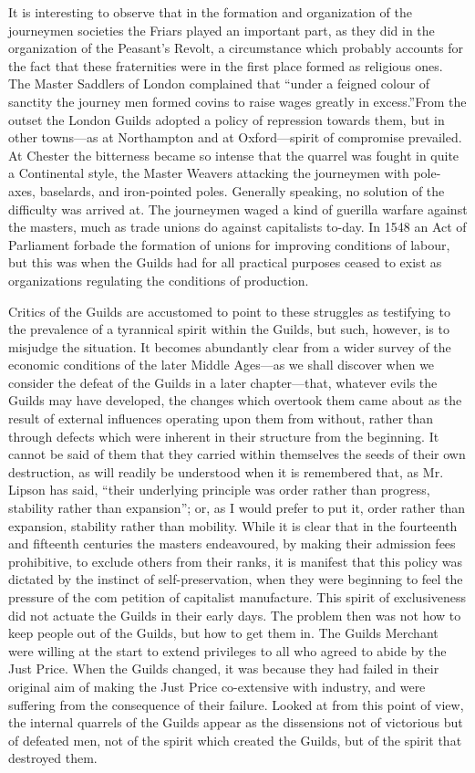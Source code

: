 \documentclass{book}
\begin{document}
It is interesting to observe that in the formation and organization of the journeymen societies the Friars played an important part, as they did in the organization of the Peasant’s Revolt, a circumstance which probably accounts for the fact that these fraternities were in the first place formed as religious ones. The Master Saddlers of London complained that “under a feigned colour of sanctity the journey men formed covins to raise wages greatly in excess.”\footnotemark[7] From the outset the London Guilds adopted a policy of repression towards them, but in other towns—as at Northampton and at Oxford—spirit of compromise prevailed. At Chester the bitterness became so intense that the quarrel was fought in quite a Continental style, the Master Weavers attacking the journeymen with pole-axes, baselards, and iron-pointed poles. Generally speaking, no solution of the difficulty was arrived at. The journeymen waged a kind of guerilla warfare against the masters, much as trade unions do against capitalists to-day. In 1548 an Act of Parliament forbade the formation of unions for improving conditions of labour, but this was when the Guilds had for all practical purposes ceased to exist as organizations regulating the conditions of production.

Critics of the Guilds are accustomed to point to these struggles as testifying to the prevalence of a tyrannical spirit within the Guilds, but such, however, is to misjudge the situation. It becomes abundantly clear from a wider survey of the economic conditions of the later Middle Ages—as we shall discover when we consider the defeat of the Guilds in a later chapter—that, whatever evils the Guilds may have developed, the changes which overtook them came about as the result of external influences operating upon them from without, rather than through defects which were inherent in their structure from the beginning. It cannot be said of them that they carried within themselves the seeds of their own destruction, as will readily be understood when it is remembered that, as Mr. Lipson has said, “their underlying principle was order rather than progress, stability rather than expansion”; or, as I would prefer to put it, order rather than expansion, stability rather than mobility. While it is clear that in the fourteenth and fifteenth centuries the masters endeavoured, by making their admission fees prohibitive, to exclude others from their ranks, it is manifest that this policy was dictated by the instinct of self-preservation, when they were beginning to feel the pressure of the com petition of capitalist manufacture. This spirit of exclusiveness did not actuate the Guilds in their early days. The problem then was not how to keep people out of the Guilds, but how to get them in. The Guilds Merchant were willing at the start to extend privileges to all who agreed to abide by the Just Price. When the Guilds changed, it was because they had failed in their original aim of making the Just Price co-extensive with industry, and were suffering from the consequence of their failure. Looked at from this point of view, the internal quarrels of the Guilds appear as the dissensions not of victorious but of defeated men, not of the spirit which created the Guilds, but of the spirit that destroyed them.
\end{document}

